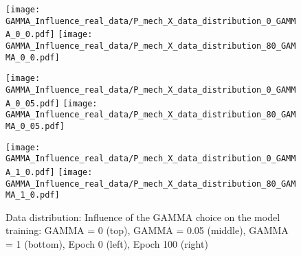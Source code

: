 \begin{figure}[H]
  \centering
  \texttt{[image: GAMMA\_Influence\_real\_data/P\_mech\_X\_data\_distribution\_0\_GAMMA\_0\_0.pdf]}
  \hspace{.4cm}
  \texttt{[image: GAMMA\_Influence\_real\_data/P\_mech\_X\_data\_distribution\_80\_GAMMA\_0\_0.pdf]}

  \vspace{.1cm}

  \texttt{[image: GAMMA\_Influence\_real\_data/P\_mech\_X\_data\_distribution\_0\_GAMMA\_0\_05.pdf]}
  \hspace{.4cm}
  \texttt{[image: GAMMA\_Influence\_real\_data/P\_mech\_X\_data\_distribution\_80\_GAMMA\_0\_05.pdf]}

  \vspace{.1cm}

  \texttt{[image: GAMMA\_Influence\_real\_data/P\_mech\_X\_data\_distribution\_0\_GAMMA\_1\_0.pdf]}
  \hspace{.4cm}
  \texttt{[image: GAMMA\_Influence\_real\_data/P\_mech\_X\_data\_distribution\_80\_GAMMA\_1\_0.pdf]}

  \vspace{.1cm}

  \caption{Data  distribution:  Influence of the GAMMA choice on the model training:  GAMMA  =  0  (top), GAMMA = 0.05 (middle), GAMMA = 1 (bottom), Epoch 0 (left), Epoch 100 (right)}
  \label{fig:distribution_GAMMA_influence_real_data}
\end{figure}


